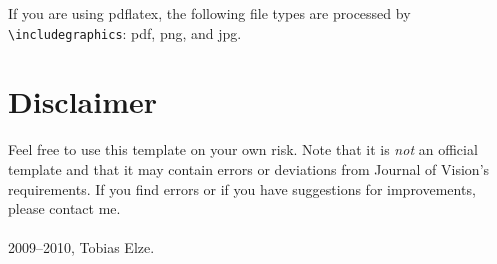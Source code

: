 \documentclass{jov}
\begin{document}
If you are using pdflatex, the following file types are processed by 
\verb=\includegraphics=: pdf, png, and jpg.

\section{Disclaimer}

Feel free to use this template on your own risk. Note that it is \textit{not} an 
official template and that it may contain errors or deviations from 
Journal of Vision's requirements. If you find errors or if you have 
suggestions for improvements, please contact me.\\ \\
\textcopyright{} 2009--2010, Tobias Elze.



\end{document}
